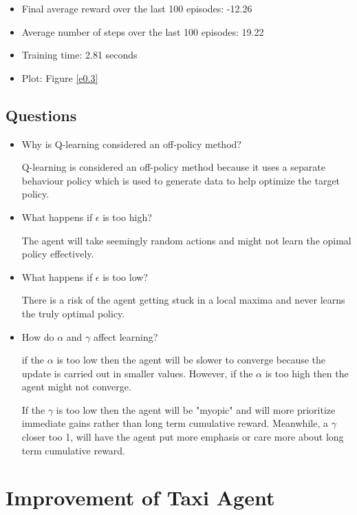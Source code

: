 \documentclass[11pt]{article}
\begin{document}
\begin{itemize}
    \item Final average reward over the last 100 episodes: -12.26
    \item Average number of steps over the last 100 episodes: 19.22
    \item Training time: 2.81 seconds
    \item Plot: Figure \ref{e0.3}
\end{itemize}

\subsection*{Questions}

\begin{itemize}
    \item Why is Q-learning considered an off-policy method?
    
    Q-learning is considered an off-policy method because it uses a separate behaviour policy which is used to generate data to help optimize the target policy.

    \item What happens if $\epsilon$ is too high?
    
    The agent will take seemingly random actions and might not learn the opimal policy effectively.

    \item What happens if $\epsilon$ is too low?
    
    There is a risk of the agent getting stuck in a local maxima and never learns the truly optimal policy.

    \item How do $\alpha$ and $\gamma$ affect learning?
        
    if the $\alpha$ is too low then the agent will be slower to converge because the update is carried out in smaller values. However, if the $\alpha$ is too high then the agent might not converge.
    
    If the $\gamma$ is too low then the agent will be "myopic" and will more prioritize immediate gains rather than long term cumulative reward. Meanwhile, a $\gamma$ closer too 1, will have the agent put more emphasis or care more about long term cumulative reward.
\end{itemize}

\section*{Improvement of Taxi Agent}
\end{document}
